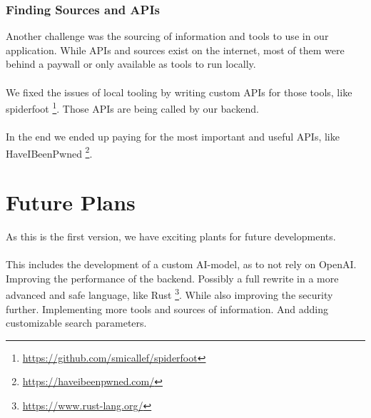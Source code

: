 \documentclass[
    a4paper,
    pagesize,
	pdftex,
    12pt,
]{scrartcl}
\begin{document}
\subsubsection{Finding Sources and APIs}
Another challenge was the sourcing of information and tools to use in our application. While APIs and sources exist on the internet, most of them were behind a paywall or only available as tools to run locally.
\\ \\
We fixed the issues of local tooling by writing custom APIs for those tools, like spiderfoot \footnote{\url{https://github.com/smicallef/spiderfoot}}. Those APIs are being called by our backend.
\\ \\
In the end we ended up paying for the most important and useful APIs, like HaveIBeenPwned  \footnote{\url{https://haveibeenpwned.com/}}.

\section{Future Plans}
As this is the first version, we have exciting plants for future developments.
\\ \\
This includes the development of a custom AI-model, as to not rely on OpenAI. 
Improving the performance of the backend. Possibly a full rewrite in a more advanced and safe language, like Rust \footnote{\url{https://www.rust-lang.org/}}. 
While also improving the security further. 
Implementing more tools and sources of information. 
And adding customizable search parameters.

\newpage



\end{document}
